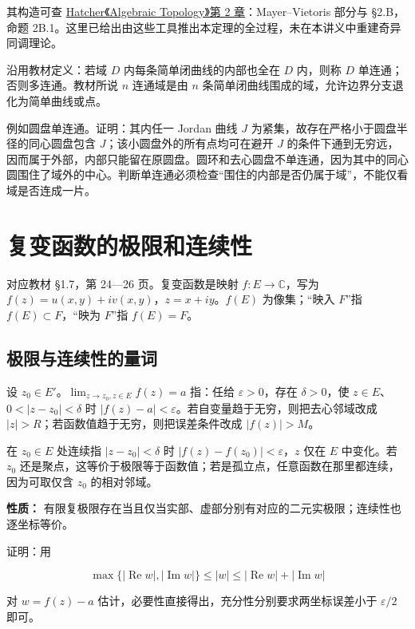 \documentclass[11pt,a4paper]{article}
\begin{document}
其构造可查
\href{https://pi.math.cornell.edu/~hatcher/AT/ATch2.pdf}{Hatcher《Algebraic
Topology》第 2 章}：Mayer--Vietoris 部分与 §2.B，命题
2B.1。这里已给出由这些工具推出本定理的全过程，未在本讲义中重建奇异同调理论。

沿用教材定义：若域 \(D\) 内每条简单闭曲线的内部也全在 \(D\) 内，则称
\(D\) 单连通；否则多连通。教材所说 \(n\) 连通域是由 \(n\)
条简单闭曲线围成的域，允许边界分支退化为简单曲线或点。

例如圆盘单连通。证明：其内任一 Jordan 曲线 \(J\)
为紧集，故存在严格小于圆盘半径的同心圆盘包含
\(J\)；该小圆盘外的所有点均可在避开 \(J\)
的条件下通到无穷远，因而属于外部，内部只能留在原圆盘。圆环和去心圆盘不单连通，因为其中的同心圆围住了域外的中心。判断单连通必须检查``围住的内部是否仍属于域''，不能仅看域是否连成一片。

\section{复变函数的极限和连续性}
对应教材 §1.7，第 24---26 页。复变函数是映射 \(f:E\to\mathbb C\)，写为
\(f(z)=u(x,y)+iv(x,y)\)，\(z=x+iy\)。\(f(E)\) 为像集；``映入 \(F\)''指
\(f(E)\subset F\)，``映为 \(F\)''指 \(f(E)=F\)。

\subsection{极限与连续性的量词}\label{ux6781ux9650ux4e0eux8fdeux7eedux6027ux7684ux91cfux8bcd}

设 \(z_0\in E'\)。\(\lim_{z\to z_0,z\in E}f(z)=a\) 指：任给
\(\varepsilon>0\)，存在 \(\delta>0\)，使
\(z\in E\)、\(0<|z-z_0|<\delta\) 时
\(|f(z)-a|<\varepsilon\)。若自变量趋于无穷，则把去心邻域改成
\(|z|>R\)；若函数值趋于无穷，则把误差条件改成 \(|f(z)|>M\)。

在 \(z_0\in E\) 处连续指 \(|z-z_0|<\delta\) 时
\(|f(z)-f(z_0)|<\varepsilon\)，\(z\) 仅在 \(E\) 中变化。若 \(z_0\)
还是聚点，这等价于极限等于函数值；若是孤立点，任意函数在那里都连续，因为可取仅含
\(z_0\) 的相对邻域。

\textbf{性质：}
有限复极限存在当且仅当实部、虚部分别有对应的二元实极限；连续性也逐坐标等价。

证明：用

\[
\max\{|\operatorname{Re}w|,|\operatorname{Im}w|\}\le|w|
\le |\operatorname{Re}w|+|\operatorname{Im}w|
\]

对 \(w=f(z)-a\) 估计，必要性直接得出，充分性分别要求两坐标误差小于
\(\varepsilon/2\) 即可。
\end{document}
